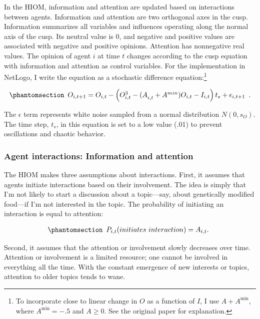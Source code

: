 \documentclass[
  a4paper,
  DIV=11,
  numbers=noendperiod,
  oneside]{scrreprt}
\begin{document}
In the HIOM, information and attention are updated based on interactions
between agents. Information and attention are two orthogonal axes in the
cusp. Information summarizes all variables and influences operating
along the normal axis of the cusp. Its neutral value is 0, and negative
and positive values are associated with negative and positive opinions.
Attention has nonnegative real values. The opinion of agent \(i\) at
time \(t\) changes according to the cusp equation with information and
attention as control variables. For the implementation in NetLogo, I
write the equation as a stochastic difference equation:\footnote{To
  incorporate close to linear change in \(O\) as a function of \(I\), I
  use \(A + A^{\min}\), where \(A^{\min} = -.5\) and \(A ≥ 0\). See the
  original paper for explanation.}

\begin{equation}\phantomsection\label{eq-ch7-3-old-52}{\begin{array}{r}
O_{i,t+1}=O_{i,t}-\left(O_{i,t}^3-{(A}_{i,t}+A^{min})O_{i,t}-I_{i,t}\right)t_s+\epsilon_{i,t+1}
\end{array}.}\end{equation}

The \(\epsilon\) term represents white noise sampled from a normal
distribution \(N(0, s_{O})\). The time step, \(t_{s}\), in this equation
is set to a low value (.01) to prevent oscillations and chaotic
behavior.

\subsubsection{Agent interactions: Information and
attention}\label{sec-Agent-interactions-information-and-attention}

The HIOM makes three assumptions about interactions. First, it assumes
that agents initiate interactions based on their involvement. The idea
is simply that I'm not likely to start a discussion about a topic---say,
about genetically modified food---if I'm not interested in the topic.
The probability of initiating an interaction is equal to attention:

\begin{equation}\phantomsection\label{eq-ch7-4-old-53}{\begin{array}{r}
P_{i,t}(initiates\ interaction) = A_{i,t}.
\end{array}}\end{equation}

Second, it assumes that the attention or involvement slowly decreases
over time. Attention or involvement is a limited resource; one cannot be
involved in everything all the time. With the constant emergence of new
interests or topics, attention to older topics tends to wane.
\end{document}
